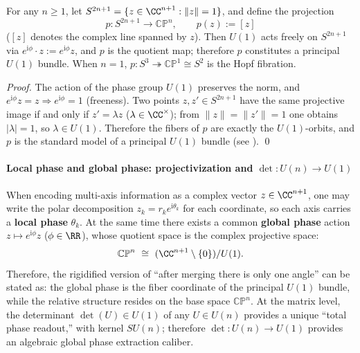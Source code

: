 \begin{proposition}\label{prop:phase-tower-principal-u1}
For any \(n\ge 1\), let
\(
S^{2n+1}=\{z\in\CC^{n+1}:\|z\|=1\}
\), and define the projection
\[
p:S^{2n+1}\to \mathbb{CP}^{n},\qquad p(z):=[z]
\]
(\([z]\) denotes the complex line spanned by \(z\)).
Then \(U(1)\) acts freely on \(S^{2n+1}\) via \(e^{\mathrm{i}\phi}\cdot z:=e^{\mathrm{i}\phi}z\), and \(p\) is the quotient map; therefore \(p\) constitutes a principal \(U(1)\) bundle.
When \(n=1\), \(p:S^{3}\twoheadrightarrow\mathbb{CP}^{1}\cong S^{2}\) is the Hopf fibration.
\end{proposition}
\begin{proof}
The action of the phase group \(U(1)\) preserves the norm, and \(e^{\mathrm{i}\phi}z=z\Rightarrow e^{\mathrm{i}\phi}=1\) (freeness).
Two points \(z,z'\in S^{2n+1}\) have the same projective image if and only if \(z'=\lambda z\) (\(\lambda\in\CC^\times\)); from \(\|z\|=\|z'\|=1\) one obtains \(|\lambda|=1\), so \(\lambda\in U(1)\).
Therefore the fibers of \(p\) are exactly the \(U(1)\)-orbits, and \(p\) is the standard model of a principal \(U(1)\) bundle (see \cite{Husemoller1994FiberBundles}). \qed
\end{proof}

\paragraph{Local phase and global phase: projectivization and \texorpdfstring{$\det:U(n)\to U(1)$}{det}}
When encoding multi-axis information as a complex vector \(z\in\CC^{n+1}\), one may write the polar decomposition \(z_k=r_k e^{\mathrm{i}\theta_k}\) for each coordinate, so each axis carries a \textbf{local phase} \(\theta_k\).
At the same time there exists a common \textbf{global phase} action \(z\mapsto e^{\mathrm{i}\phi}z\) (\(\phi\in\RR\)), whose quotient space is the complex projective space:
\[
\mathbb{CP}^{n}\ \cong\ (\CC^{n+1}\setminus\{0\})/U(1).
\]
Therefore, the rigidified version of ``after merging there is only one angle'' can be stated as: the global phase is the fiber coordinate of the principal \(U(1)\) bundle, while the relative structure resides on the base space \(\mathbb{CP}^{n}\).
At the matrix level, the determinant \(\det(U)\in U(1)\) of any \(U\in U(n)\) provides a unique ``total phase readout,'' with kernel \(SU(n)\); therefore \(\det:U(n)\to U(1)\) provides an algebraic global phase extraction caliber.

